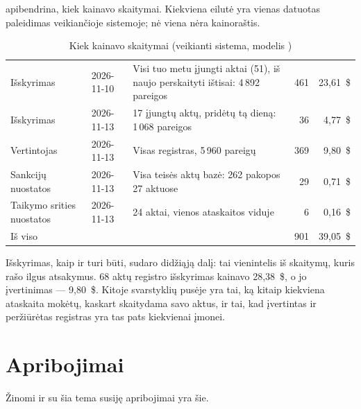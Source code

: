  apibendrina, kiek kainavo skaitymai. Kiekviena eilutė yra vienas
datuotas paleidimas veikiančioje sistemoje; nė viena nėra kainoraštis.

\begin{table}[H]
\caption{Kiek kainavo skaitymai (veikianti sistema, modelis )}\label{tab:obligations:cost}
\begin{tabularx}{\textwidth}{@{}L{38mm}L{22mm}Yrr@{}}
\toprule
{} &  &  &  &  \\
\midrule
Išskyrimas & 2026-11-10 & Visi tuo metu įjungti aktai (51), iš naujo perskaityti ištisai: 4\,892 pareigos & 461 & 23,61~\$ \\
Išskyrimas & 2026-11-13 & 17 įjungtų aktų, pridėtų tą dieną: 1\,068 pareigos & 36 & 4,77~\$ \\
Vertintojas & 2026-11-13 & Visas registras, 5\,960 pareigų & 369 & 9,80~\$ \\
Sankcijų nuostatos & 2026-11-13 & Visa teisės aktų bazė: 262 pakopos 27 aktuose & 29 & 0,71~\$ \\
Taikymo srities nuostatos & 2026-11-13 & 24 aktai, vienos ataskaitos viduje & 6 & 0,16~\$ \\
\midrule
Iš viso & & & 901 & 39,05~\$ \\
\bottomrule
\end{tabularx}
\end{table}

Išskyrimas, kaip ir turi būti, sudaro didžiąją dalį: tai vienintelis iš skaitymų, kuris rašo
ilgus atsakymus. 68 aktų registro išskyrimas kainavo 28,38~\$, o jo įvertinimas --- 9,80~\$. Kitoje
svarstyklių pusėje yra tai, ką kitaip kiekviena ataskaita mokėtų, kaskart skaitydama savo aktus,
ir tai, kad įvertintas ir peržiūrėtas registras yra tas pats kiekvienai įmonei.


\section{Apribojimai}\label{sec:obligations:limits}

Žinomi ir su šia tema susiję apribojimai yra šie.


